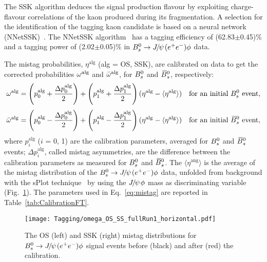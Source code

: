 The SSK algorithm deduces the signal production flavour by exploiting charge-flavour correlations of the kaon produced during its fragmentation. A selection for the identification of the tagging kaon candidate is based on a neural network (NNetSSK)~\cite{LHCb:2012zja}. The NNetSSK algorithm~\cite{Aaij:2016psi} has a tagging efficiency of (62.83$\pm$0.45)$\%$ and a tagging power of (2.02$\pm$0.05)$\%$ in ${{B}^0_{s}}\rightarrow{\ensuremath{{J\mskip -3mu/\mskip -2mu\psi\mskip 2mu}}}({e^+e^-})\phi$ data.

The mistag probabilities, $\eta^{\text{alg}}$ (alg = OS, SSK), are calibrated on data to get the corrected probabilities $\omega^{\text{alg}}$ and $\bar{\omega}^{\text{alg}}$, for ${{B}^0_{s}}$ and ${{\kern 0.18em\overline{\kern -0.18em B}{}}{}^0_{s}}$, respectively:
\[
  \omega^{\text{alg}}=\left(p_{0}^{\text{alg}}+\frac{\Delta p_{0}^{\text{alg}}}{2}\right)+\left(p_{1}^{\text{alg}}+\frac{\Delta p_{1}^{\text{alg}}}{2}\right)(\eta^{\text{alg}}-\langle\eta^{\text{alg}}\rangle)\quad\text{for an initial ${{B}^0_{s}}$ event}, 
\]
\begin{equation}\label{eq:mistag}
 \bar{\omega}^{\text{alg}}=\left(p_{0}^{\text{alg}}-\frac{\Delta p_{0}^{\text{alg}}}{2}\right)+\left(p_{1}^{\text{alg}}-\frac{\Delta p_{1}^{\text{alg}}}{2}\right)(\eta^{\text{alg}}-\langle\eta^{\text{alg}}\rangle)\quad\text{for an initial ${{\kern 0.18em\overline{\kern -0.18em B}{}}{}^0_{s}}$ event},
\end{equation}
where $p^{\text{alg}}_{i}$ ($i$ = 0, 1) are the calibration parameters, averaged for ${{B}^0_{s}}$ and ${{\kern 0.18em\overline{\kern -0.18em B}{}}{}^0_{s}}$ events; $\Delta p^{\text{alg}}_{i}$, called mistag asymmetries, are the difference between the calibration parameters as measured for ${{B}^0_{s}}$ and ${{\kern 0.18em\overline{\kern -0.18em B}{}}{}^0_{s}}$. The $\langle\eta^{\text{ang}}\rangle$ is the average of the mistag distribution of the ${{B}^0_{s}}\rightarrow{\ensuremath{{J\mskip -3mu/\mskip -2mu\psi\mskip 2mu}}}({e^+e^-})\phi$ data, unfolded from background with the sPlot technique~\cite{Pivk:2004ty} by using the ${{J\mskip -3mu/\mskip -2mu\psi\mskip 2mu}}\phi$ mass as discriminating variable (Fig.~\ref{fig:Mistag}). The parameters used in Eq.~\ref{eq:mistag} are reported in Table~\ref{tab:CalibrationFT}. 
\begin{figure}[hbt]
  \begin{center}
    \texttt{[image: Tagging/omega\_OS\_SS\_fullRun1\_horizontal.pdf]}
     \vspace*{-0.5cm}
  \end{center}
    \caption{
   The OS (left) and SSK (right) mistag distributions for ${{B}^0_{s}}\rightarrow{\ensuremath{{J\mskip -3mu/\mskip -2mu\psi\mskip 2mu}}}({e^+e^-})\phi$ signal events before (black) and after (red) the calibration.}
  \label{fig:Mistag} 
\end{figure}
